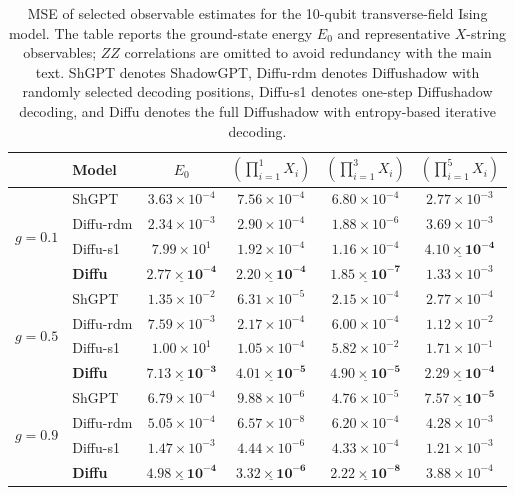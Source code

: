 \documentclass[11pt]{article}
\begin{document}
\begin{table}[htbp]
\centering
\small
\caption{MSE of selected observable estimates for the 10-qubit transverse-field Ising model. The table reports the ground-state energy \(E_0\) and representative \(X\)-string observables; \(ZZ\) correlations are omitted to avoid redundancy with the main text. ShGPT denotes ShadowGPT, Diffu-rdm denotes Diffushadow with randomly selected decoding positions, Diffu-s1 denotes one-step Diffushadow decoding, and Diffu denotes the full Diffushadow with entropy-based iterative decoding.}
\label{tab:mse_table}
\begin{tabular}{llcccc}
\hline
 &Model & $E_0$ & $\left(\prod_{i=1}^1 X_i\right)$ & $\left(\prod_{i=1}^3 X_i\right)$ & $\left(\prod_{i=1}^5 X_i\right)$\\
\hline
\multirow{4}{*}{$g=0.1$} 
& ShGPT      & $3.63{\times}10^{-4}$ & $7.56{\times}10^{-4}$ & $6.80{\times}10^{-4}$ & $2.77{\times}10^{-3}$\\
& Diffu-rdm & $2.34{\times}10^{-3}$ & $2.90{\times}10^{-4}$ & $1.88{\times}10^{-6}$ & $3.69{\times}10^{-3}$\\
& Diffu-s1  & $7.99{\times}10^{1}$ & $1.92{\times}10^{-4}$ & $1.16{\times}10^{-4}$ & $\underline{\mathbf{4.10{\times}10^{-4}}}$\\
& \textbf{Diffu}    & $\underline{\mathbf{2.77{\times}10^{-4}}}$ & $\underline{\mathbf{2.20{\times}10^{-4}}}$ & $\underline{\mathbf{1.85{\times}10^{-7}}}$ & $1.33{\times}10^{-3}$\\
\hline
\multirow{4}{*}{$g=0.5$} 
& ShGPT      & $1.35{\times}10^{-2}$ & $6.31{\times}10^{-5}$ & $2.15{\times}10^{-4}$ & $2.77{\times}10^{-4}$\\
& Diffu-rdm & $7.59{\times}10^{-3}$ & $2.17{\times}10^{-4}$ & $6.00{\times}10^{-4}$ & $1.12{\times}10^{-2}$\\
& Diffu-s1  & $1.00{\times}10^{1}$ & $1.05{\times}10^{-4}$ & $5.82{\times}10^{-2}$ & $1.71{\times}10^{-1}$\\
& \textbf{Diffu}    & $\underline{\mathbf{7.13{\times}10^{-3}}}$ & $\underline{\mathbf{4.01{\times}10^{-5}}}$ & $\underline{\mathbf{4.90{\times}10^{-5}}}$ & $\underline{\mathbf{2.29{\times}10^{-4}}}$\\
\hline
\multirow{4}{*}{$g=0.9$} 
& ShGPT      & $6.79{\times}10^{-4}$ & $9.88{\times}10^{-6}$ & $4.76{\times}10^{-5}$ & $\underline{\mathbf{7.57{\times}10^{-5}}}$\\
& Diffu-rdm & $5.05{\times}10^{-4}$ & $6.57{\times}10^{-8}$ & $6.20{\times}10^{-4}$ & $4.28{\times}10^{-3}$\\
& Diffu-s1  & $1.47{\times}10^{-3}$ & $4.44{\times}10^{-6}$ & $4.33{\times}10^{-4}$ & $1.21{\times}10^{-3}$\\
& \textbf{Diffu}    & $\underline{\mathbf{4.98{\times}10^{-4}}}$ & $\underline{\mathbf{3.32{\times}10^{-6}}}$ & $\underline{\mathbf{2.22{\times}10^{-8}}}$ & $3.88{\times}10^{-4}$\\
\hline
\end{tabular}
\end{table}
\end{document}
